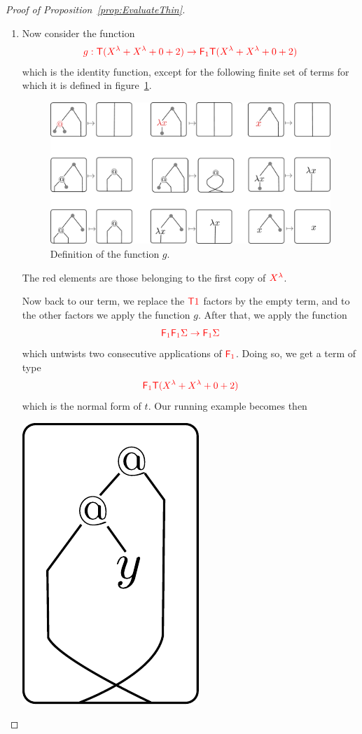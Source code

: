\begin{proof}[Proof of Proposition~\ref{prop:EvaluateThin}]
\begin{enumerate}
\item Now consider the function 
 \begin{align*}
 {\color{red}{g: {\color{red}{\mathsf T}}(X^\lambda+X^\lambda+0+2) \to {\color{red}{\mathsf F_{1}}}{\color{red}{\mathsf T}}(X^\lambda+X^\lambda+0+2)}}
 \end{align*}
 which is the identity function, except for the following finite set of terms for which it is defined in figure~\ref{fig:definition-g}.
\begin{figure}
\begin{center}
\includegraphics[scale=.3]{pictures/function-g}
\end{center}
\caption{Definition of the function $g$.} \label{fig:definition-g}
\end{figure}
The red elements are those belonging to the first copy of ${\color{red}{{X}^{{\color{red}{\lambda}}}}}$.
\smallskip

Now back to our term, we replace the  ${\color{red}{{\color{red}{\mathsf T}}1}}$ factors by the empty term, and to the other factors we apply the function $g$. After that, we apply the function 
\begin{align*}
{\color{red}{{\color{red}{\mathsf F_{1}}}{\color{red}{\mathsf F_{1}}}\Sigma \to {\color{red}{\mathsf F_{1}}}\Sigma}}
\end{align*}
which untwists two consecutive applications of $\reduce 1$. Doing so, we get a term of type  $${\color{red}{{\color{red}{\mathsf F_{1}}}{\color{red}{\mathsf T}}(X^\lambda+X^\lambda+0+2)}}$$ which is  the normal form of $t$. Our running example becomes then
\begin{center}
\includegraphics[scale=.3]{pictures/running-thin-5}
\end{center}


\end{enumerate}
\end{proof}
